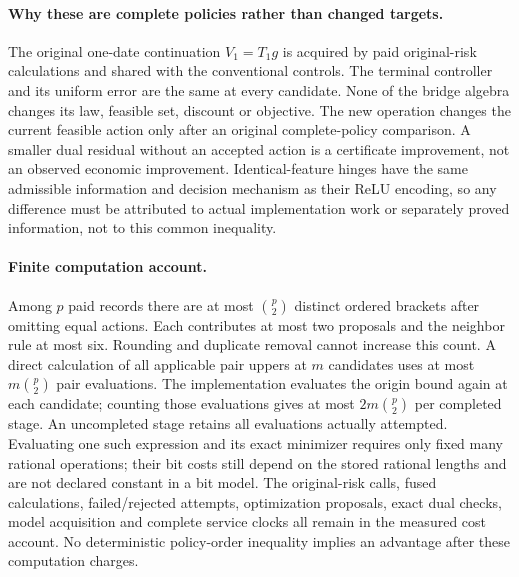 \paragraph{Why these are complete policies rather than changed targets.}
The original one-date continuation $V_1=T_1g$ is acquired by paid
original-risk calculations and shared with the conventional controls.
The terminal controller and its uniform error are the same at every
candidate. None of the bridge algebra changes its law, feasible set,
discount or objective. The new operation changes the current feasible
action only after an original complete-policy comparison. A smaller
dual residual without an accepted action is a certificate improvement,
not an observed economic improvement. Identical-feature hinges have
the same admissible information and decision mechanism as their ReLU
encoding, so any difference must be attributed to actual implementation
work or separately proved information, not to this common inequality.

\paragraph{Finite computation account.}
Among $p$ paid records there are at most $\binom p2$ distinct ordered
brackets after omitting equal actions. Each contributes at most two
proposals and the neighbor rule at most six. Rounding and duplicate
removal cannot increase this count. A direct calculation of all
applicable pair uppers at $m$ candidates uses at most
$m\binom p2$ pair evaluations. The implementation evaluates the
origin bound again at each candidate; counting those evaluations
gives at most $2m\binom p2$ per completed stage. An uncompleted
stage retains all evaluations actually attempted. Evaluating one such expression and
its exact minimizer requires only fixed many rational operations;
their bit costs still depend on the stored rational lengths and are
not declared constant in a bit model. The original-risk calls,
fused calculations, failed/rejected attempts, optimization proposals,
exact dual checks, model acquisition and complete service clocks all
remain in the measured cost account. No deterministic policy-order
inequality implies an advantage after these computation charges.
